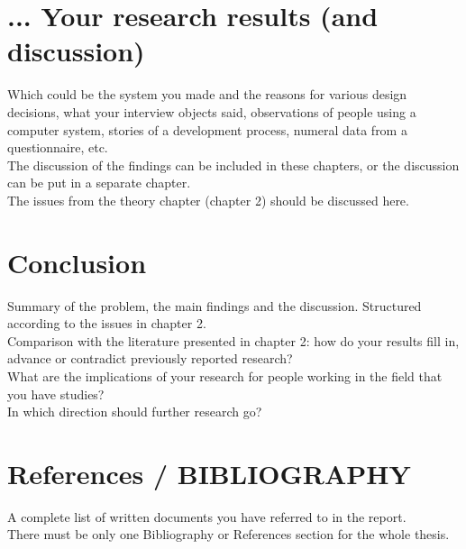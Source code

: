 \chapter{... Your research results (and discussion)}
  Which could be the system you made and the reasons for various design decisions, what your 
    interview objects said, observations of people using a computer system, stories of a development 
    process, numeral data from a questionnaire, etc. \\
  The discussion of the findings can be included in these chapters, or the discussion can be put in 
    a separate chapter.  \\
  The issues from the theory chapter (chapter 2) should be discussed here.

\chapter{Conclusion}
  Summary of the problem, the main findings and the discussion. Structured according to the issues 
    in chapter 2. \\
  Comparison with the literature presented in chapter 2: how do your results fill in, advance or 
    contradict previously reported research? \\
  What are the implications of your research for people working in the field that you have studies? \\
  In which direction should further research go?  \\

\chapter{References / BIBLIOGRAPHY}
  A complete list of written documents you have referred to in the report. \\
  There must be only one Bibliography or References section for the whole thesis.

